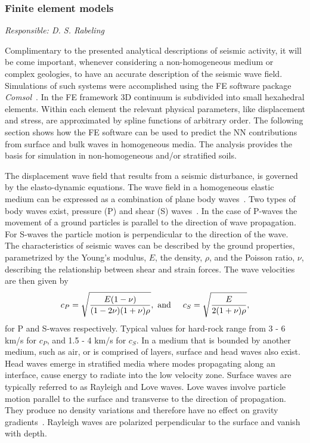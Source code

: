 \subsubsection{Finite element models}
\label{subsub:NNfiniteelementmodels}

\emph{
Responsible:  D. S. Rabeling  \\
}

Complimentary to the presented analytical descriptions of seismic activity, it will be come important, whenever considering a non-homogeneous medium or complex geologies, to have an accurate description of the seismic wave field. Simulations of such systems were accomplished using the FE software package \textit{Comsol}~\cite{comsol}. In the FE framework 3D continuum is subdivided into small hexahedral elements. Within each element the relevant physical parameters, like displacement and stress, are approximated by spline functions of arbitrary order. The following section shows how the FE software can be used to predict the NN contributions from surface and bulk waves in homogeneous media. The analysis provides the basis for simulation in non-homogeneous and/or stratified soils.

The displacement wave field that results from a seismic disturbance, is governed by the elasto-dynamic equations. The wave field in a homogeneous elastic medium can be expressed as a combination of plane body waves~\cite{seismic_schevenels}. Two types of body waves exist, pressure (P) and shear (S) waves~\cite{seismic_achenbach}. In the case of P-waves the movement of a ground particles is parallel to the direction of wave propagation. For S-waves the particle motion is perpendicular to the direction of the wave. The characteristics of seismic waves can be described by the ground properties, parametrized by  the Young's modulus, $E$,  the density, $\rho$, and  the Poisson ratio, $\nu$, describing the relationship between shear and strain forces. The wave velocities are then given by
\begin{eqnarray}
	c_P = \sqrt{\frac{E(1-\nu)}{(1-2\nu)(1+\nu)\rho}},\mbox{ and} \hspace{0.5cm} c_S = \sqrt{\frac{E}{2(1+\nu)\rho}},
	\label{eq3.38}
\end{eqnarray}
for P and S-waves respectively. Typical values for hard-rock range from 3 - 6 km/s for $c_P$, and 1.5 - 4 km/s for $c_S$.
In a medium that is bounded by another medium, such as air, or is comprised of layers, surface and head waves also exist. Head waves emerge in stratified media where modes propagating along an interface, cause energy to radiate into the low velocity zone. Surface waves are typically referred to as Rayleigh and Love waves. Love waves involve particle motion parallel to the surface and transverse to the direction of propagation. They produce no density variations and therefore have no effect on gravity gradients~\cite{GGThorne}. Rayleigh waves are polarized perpendicular to the surface and vanish with depth.

